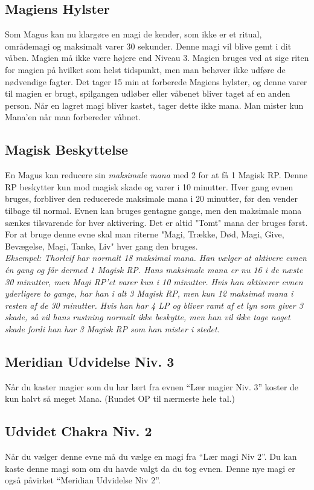 \subsection{Magiens Hylster}
Som Magus kan nu klargøre en magi de kender, som ikke er et ritual, områdemagi og maksimalt varer 30 sekunder. Denne magi vil blive gemt i dit våben. Magien må ikke være højere end Niveau 3. Magien bruges ved at sige riten for magien på hvilket som helst tidspunkt, men man behøver ikke udføre de nødvendige fagter. Det tager 15 min at forberede Magiens hylster, og denne varer til magien er brugt, spilgangen udløber eller våbenet bliver taget af en anden person. Når en lagret magi bliver kastet, tager dette ikke mana. Man mister kun Mana'en når man forbereder våbnet.


\subsection{Magisk Beskyttelse}
En Magus kan reducere sin \textit{maksimale mana} med 2 for at få 1 Magisk RP. Denne RP beskytter kun mod magisk skade og varer i 10 minutter. Hver gang evnen bruges, forbliver den reducerede maksimale mana i 20 minutter, før den vender tilbage til normal. Evnen kan bruges gentagne gange, men den maksimale mana sænkes tilsvarende for hver aktivering. Det er altid "Tomt" mana der bruges først. For at bruge denne evne skal man riterne "Magi, Trække, Død, Magi, Give, Bevægelse, Magi, Tanke, Liv" hver gang den bruges.\\
\textit{Eksempel: Thorleif har normalt 18 maksimal mana. Han vælger at aktivere evnen én gang og får dermed 1 Magisk RP. Hans maksimale mana er nu 16 i de næste 30 minutter, men Magi RP’et varer kun i 10 minutter. Hvis han aktiverer evnen yderligere to gange, har han i alt 3 Magisk RP, men kun 12 maksimal mana i resten af de 30 minutter. Hvis han har 4 LP og bliver ramt af et lyn som giver 3 skade, så vil hans rustning normalt ikke beskytte, men han vil ikke tage noget skade fordi han har 3 Magisk RP som han mister i stedet.}


\subsection{Meridian Udvidelse Niv. 3}
Når du kaster magier som du har lært fra evnen “Lær magier Niv. 3” koster de kun halvt så meget Mana. (Rundet OP til nærmeste hele tal.)

\subsection{Udvidet Chakra Niv. 2}
Når du vælger denne evne må du vælge en magi fra “Lær magi Niv 2”. Du kan kaste denne magi som om du havde valgt da du tog evnen. Denne nye magi er også påvirket “Meridian Udvidelse Niv 2”.
